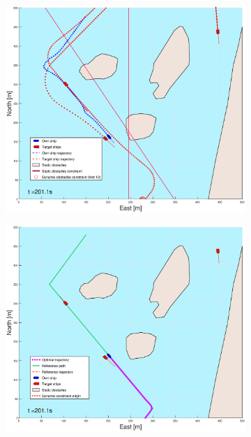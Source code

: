 \begin{figure}[ht]\ContinuedFloat
    \begin{subfigure}[b]{0.49\textwidth}
        \centering
        \includegraphics[width=\textwidth]{Images/Figures/Helloya_Rev/_Simple_0fig1_time=201}
    \end{subfigure}
    \hfill
    \begin{subfigure}[b]{0.499\textwidth}
        \centering
        \includegraphics[width=\textwidth]{Images/Figures/Helloya_Rev/_Simple_0fig999_time=201}

\end{subfigure}
\end{figure}
